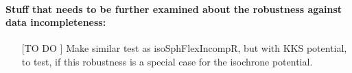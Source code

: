 \paragraph{Stuff that needs to be further examined about the robustness against data incompleteness:}
\begin{itemize}
\item[[TO DO]] Make similar test as isoSphFlexIncompR, but with KKS potential, to test, if this robustness is a special case for the isochrone potential.
\end{itemize}


%



